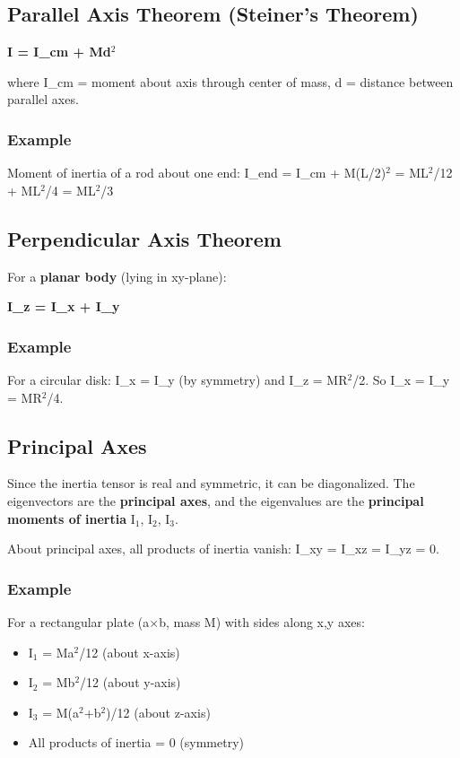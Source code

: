 \documentclass[12pt,a4paper,openany]{book}
\begin{document}
{{\subsection{Parallel Axis Theorem (Steiner's Theorem) }

\textbf{I = I_cm + Md$^2$}

where I_cm = moment about axis through center of mass, d = distance between parallel axes.

\subsubsection{Example}
Moment of inertia of a rod about one end:
I_end = I_cm + M(L/2)$^2$ = ML$^2$/12 + ML$^2$/4 = ML$^2$/3 

\subsection{Perpendicular Axis Theorem}

For a \textbf{planar body} (lying in xy-plane):

\textbf{I_z = I_x + I_y}

\subsubsection{Example}
For a circular disk: I_x = I_y (by symmetry) and I_z = MR$^2$/2.
So I_x = I_y = MR$^2$/4.

\subsection{Principal Axes}

Since the inertia tensor is real and symmetric, it can be diagonalized. The eigenvectors are the \textbf{principal axes}, and the eigenvalues are the \textbf{principal moments of inertia} I$_1$, I$_2$, I$_3$.

About principal axes, all products of inertia vanish: I_{xy} = I_{xz} = I_{yz} = 0.

\subsubsection{Example}
For a rectangular plate (a$\times$b, mass M) with sides along x,y axes:
\begin{itemize}[leftmargin=*]
  \item I$_1$ = Ma$^2$/12 (about x-axis)
  \item I$_2$ = Mb$^2$/12 (about y-axis)  
  \item I$_3$ = M(a$^2$+b$^2$)/12 (about z-axis)
  \item All products of inertia = 0 (symmetry)
\end{itemize}

}}
\end{document}
